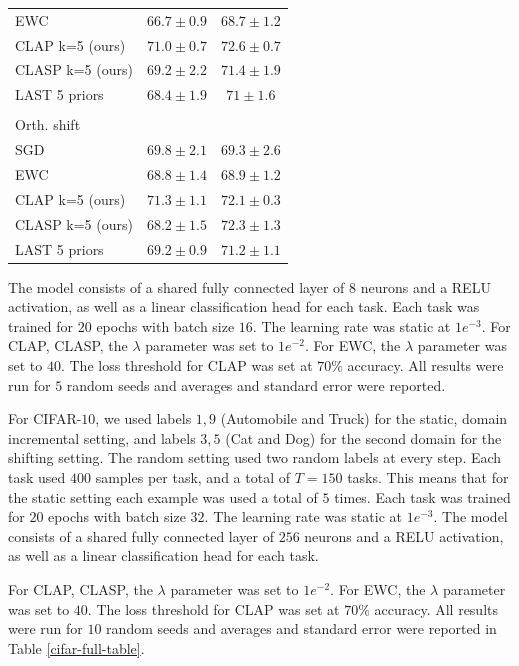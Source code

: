 \documentclass{article}
\theoremstyle{plain}
\theoremstyle{definition}
\theoremstyle{remark}
\begin{document}
\begin{table}[ht!]
\begin{center}
\begin{small}
\begin{sc}
\begin{tabular}{lcc}
EWC & $66.7\pm 0.9$ & $68.7 \pm 1.2$ \\
CLAP k=5 (ours)    & $71.0 \pm 0.7$ & $\mathbf{72.6} \pm 0.7$ \\
CLASP k=5 (ours)    & $69.2 \pm 2.2$& $71.4 \pm 1.9$       \\
LAST 5 priors    & $68.4\pm 1.9$& $71\pm 1.6$    \\ \\Orth. shift & & \\
\midrule
SGD    & $69.8\pm 2.1$ & $69.3\pm  2.6$ \\
EWC & $68.8\pm 1.4$ & $68.9 \pm 1.2$ \\
CLAP k=5 (ours)    & $\mathbf{71.3} \pm 1.1$ & $72.1 \pm 0.3$ \\
CLASP k=5 (ours)    & $68.2 \pm 1.5$& $\mathbf{72.3} \pm 1.3$       \\
LAST 5 priors    & $69.2\pm 0.9$& $71.2\pm 1.1$    \\
%
\bottomrule
\end{tabular}
\end{sc}
\end{small}
\end{center}
\vskip -0.1in
\end{table}

The model consists of a shared fully connected layer of $8$ neurons and a RELU activation, as well as a linear classification head for each task. Each task was trained for $20$ epochs with batch size $16$. The learning rate was static at $1e^{-3}$.
For CLAP, CLASP, the $\lambda$ parameter was set to $1e^{-2}$. For EWC, the $\lambda$ parameter was set to $40$. The loss threshold for CLAP was set at $70\%$ accuracy.
All results were run for $5$ random seeds and averages and standard error were reported.

For CIFAR-$10$, we used labels $1, 9$ (Automobile and Truck) for the static, domain incremental setting, and labels $3, 5$ (Cat and Dog) for the second domain for the shifting setting. The random setting used two random labels at every step.
Each task used $400$ samples per task, and a total of $T=150$ tasks. This means that for the static setting each example was used a total of $5$ times. Each task was trained for $20$ epochs with batch size $32$. The learning rate was static at $1e^{-3}$.
The model consists of a shared fully connected layer of $256$ neurons and a RELU activation, as well as a linear classification head for each task. 

For CLAP, CLASP, the $\lambda$ parameter was set to $1e^{-2}$. For EWC, the $\lambda$ parameter was set to $40$.
The loss threshold for CLAP was set at $70\%$ accuracy.
All results were run for $10$ random seeds and averages and standard error were reported in Table \ref{cifar-full-table}.
\end{document}
